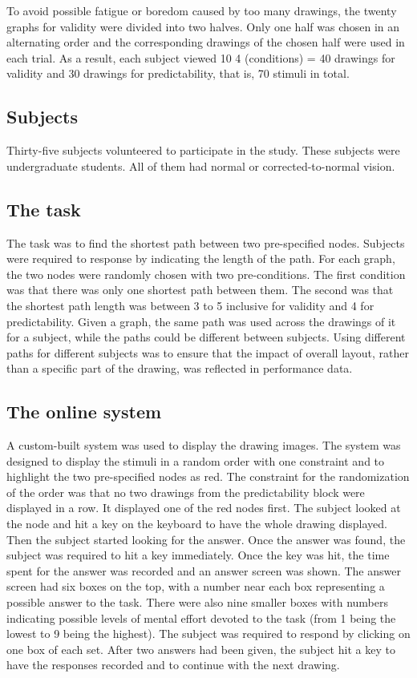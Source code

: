 \documentclass[conference,letterpaper]{IEEEtran}
\begin{document}
 



To avoid possible fatigue or boredom caused by too many drawings, the twenty graphs for validity were divided into two halves. Only one half was chosen in an alternating order and the corresponding drawings of the chosen half were used in each trial. As a result, each subject viewed 10  4 (conditions) = 40 drawings for validity and 30 drawings for predictability, that is, 70 stimuli in total.


\subsection{Subjects}


Thirty-five subjects volunteered to participate in the study. These subjects were undergraduate students. All of them had normal or corrected-to-normal vision. 


\subsection{The task}


The task was to find the shortest path between two pre-specified nodes. Subjects were required to response by indicating the length of the path. For each graph, the two nodes were randomly chosen with two pre-conditions. The first condition was that there was only one shortest path between them. The second was that the shortest path length was between 3 to 5 inclusive for validity and 4 for predictability. Given a graph, the same path was used across the drawings of it for a subject, while the paths could be different between subjects. Using different paths for different subjects was to ensure that the impact of overall layout, rather than a specific part of the drawing, was reflected in performance data.


\subsection{The online system}



A custom-built system was used to display the drawing images. The system was designed to display the  stimuli in a random order with one constraint and to highlight the two pre-specified nodes as red. The constraint for the randomization of the order was that no two drawings from the predictability block were displayed in a row. It displayed one of the red nodes first. The subject looked at the node and hit a key on the keyboard to have the whole drawing displayed. Then the subject started looking for the answer. Once the answer was found, the subject was required to hit a key immediately. Once the key was hit, the time spent for the answer was recorded and an answer screen was shown. The answer screen had six boxes on the top, with a number near each box representing a possible answer to the task. There were also nine smaller boxes with numbers indicating possible levels of mental effort devoted to the task (from 1 being the lowest to 9 being the highest). The subject was required to respond by clicking on one box of each set. After two answers had been given, the subject hit a key to have the responses recorded and to continue with the next drawing. 
\end{document}
